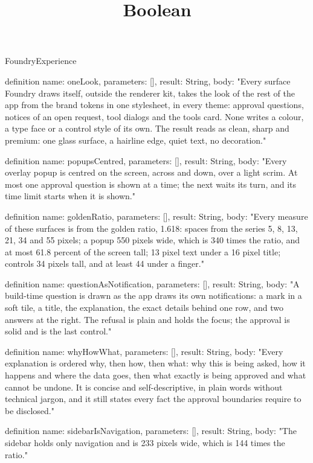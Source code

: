 \begin{lexlean}{FoundryExperience}
\title{Boolean}
\begin{semanticmodule}
definition{
  name: oneLook,
  parameters: [],
  result: String,
  body: "Every surface Foundry draws itself, outside the renderer kit, takes the look of the rest of the app from the brand tokens in one stylesheet, in every theme: approval questions, notices of an open request, tool dialogs and the tools card. None writes a colour, a type face or a control style of its own. The result reads as clean, sharp and premium: one glass surface, a hairline edge, quiet text, no decoration."
}

definition{
  name: popupsCentred,
  parameters: [],
  result: String,
  body: "Every overlay popup is centred on the screen, across and down, over a light scrim. At most one approval question is shown at a time; the next waits its turn, and its time limit starts when it is shown."
}

definition{
  name: goldenRatio,
  parameters: [],
  result: String,
  body: "Every measure of these surfaces is from the golden ratio, 1.618: spaces from the series 5, 8, 13, 21, 34 and 55 pixels; a popup 550 pixels wide, which is 340 times the ratio, and at most 61.8 percent of the screen tall; 13 pixel text under a 16 pixel title; controls 34 pixels tall, and at least 44 under a finger."
}

definition{
  name: questionAsNotification,
  parameters: [],
  result: String,
  body: "A build-time question is drawn as the app draws its own notifications: a mark in a soft tile, a title, the explanation, the exact details behind one row, and two answers at the right. The refusal is plain and holds the focus; the approval is solid and is the last control."
}

definition{
  name: whyHowWhat,
  parameters: [],
  result: String,
  body: "Every explanation is ordered why, then how, then what: why this is being asked, how it happens and where the data goes, then what exactly is being approved and what cannot be undone. It is concise and self-descriptive, in plain words without technical jargon, and it still states every fact the approval boundaries require to be disclosed."
}

definition{
  name: sidebarIsNavigation,
  parameters: [],
  result: String,
  body: "The sidebar holds only navigation and is 233 pixels wide, which is 144 times the ratio."
}


\end{semanticmodule}
\end{lexlean}
